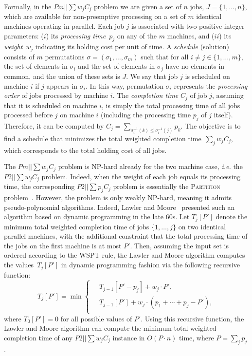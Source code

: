 \documentclass[11pt]{llncs}
\begin{document}
Formally, in the $Pm||\sum w_j C_j$ problem we are given a set of $n$ jobs, $J=\{1,\ldots,n\}$, which are available for non-preemptive processing on a set of $m$ identical machines operating in parallel. Each job $j$ is associated with two positive integer parameters: ($i$) its \emph{processing time}~$p_j$ on any of the $m$ machines, and ($ii$) its \emph{weight}~$w_j$ indicating its holding cost per unit of time. A \emph{schedule} (solution) consists of $m$ permutations $\sigma=(\sigma_1,\ldots,\sigma_m)$ such that for all $i \neq j \in \{1,\ldots,m\}$, the set of elements in $\sigma_i$ and the set of elements in $\sigma_j$ have no elements in common, and the union of these sets is $J$. We say that job $j$ is scheduled on machine $i$ if $j$ appears in $\sigma_i$. In this way, permutation $\sigma_i$ represents the \emph{processing order} of jobs processed by machine $i$. The \emph{completion time} $C_j$ of job $j$, assuming that it is scheduled on machine $i$, is simply the total processing time of all jobs processed before $j$ on machine $i$ (including the processing time $p_j$ of $j$ itself). Therefore, it can be computed by $C_j = \sum_{\sigma^{-1}_i(k) \leq \sigma^{-1}_i(j)} p_k$. The objective is to find a schedule that minimizes the total weighted completion time~$\sum_j w_jC_j$, which corresponds to the total holding cost of all jobs. %


The $Pm||\sum w_j C_j$ problem is NP-hard already for the two machine case, \emph{i.e.} the $P2||\sum w_j C_j$ problem. Indeed, when the weight of each job equals its processing time, the corresponding $P2||\sum p_j C_j$ problem is essentially the \textsc{Partition} problem~\cite{BrunoCoffman}. However, the problem is only weakly NP-hard, meaning it admits pseudo-polynomial algorithms. Indeed, Lawler and Moore~\cite{LawlerMoore} presented such an algorithm based on dynamic programming in the late 60s. Let $T_j[P']$ denote the minimum total weighted completion time of jobs $\{1,\ldots,j\}$ on two identical parallel machines, with the additional constraint that the total processing time of the jobs on the first machine is at most $P'$. Then, assuming the input set is ordered according to the WSPT rule, the Lawler and Moore algorithm computes the values~$T_j[P']$ in dynamic programming fashion via the following recursive function:
$$
T_j[P'] = \min
\begin{cases}
\quad T_{j-1}[P' - p_j] + w_j \cdot P',\\ 
\quad T_{j-1}[P'] + w_j \cdot (p_1 + \cdots + p_j -  P'), \\
\end{cases}
$$
where $T_0[P']=0$ for all possible values of $P'$. Using this recursive function, the Lawler and Moore algorithm can compute the minimum total weighted completion time of any $P2||\sum w_jC_j$ instance in $O(P \cdot n)$ time, where $P= \sum_j p_j$. 
\end{document}
